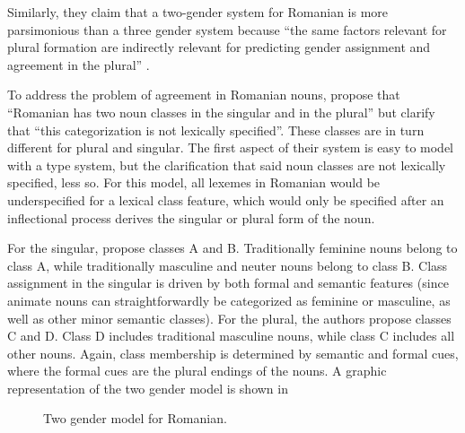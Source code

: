 Similarly, they claim that a two-gender system for Romanian is more parsimonious than a three gender system because ``the same factors relevant for plural formation are indirectly relevant for predicting gender assignment and agreement in the plural'' \autocite[45]{Bateman.2010}.

To address the problem of agreement in Romanian nouns, \textcite[52]{Bateman.2010} propose that ``Romanian has two noun classes in the singular and in the plural'' but clarify that ``this categorization is not lexically specified''. These classes are in turn different for plural and singular. The first aspect of their system is easy to model with a type system, but the clarification that said noun classes are not lexically specified, less so. For this model, all lexemes in Romanian would be underspecified for a lexical class feature, which would only be specified after an inflectional process derives the singular or plural form of the noun.

For the singular, \textcite{Bateman.2010} propose classes A and B. Traditionally feminine nouns belong to class A, while traditionally masculine and neuter nouns belong to class B. Class assignment in the singular is driven by both formal and semantic features (since animate nouns can straightforwardly be categorized as feminine or masculine, as well as other minor semantic classes). For the plural, the authors propose classes C and D. Class D includes traditional masculine nouns, while class C includes all other nouns. Again, class membership is determined by semantic and formal cues, where the formal cues are the plural endings of the nouns. A graphic representation of the two gender model is shown in 

\begin{figure}
    \caption{Two gender model for Romanian.} \label{fig:graphic-two-gender-bateman}
\end{figure}

